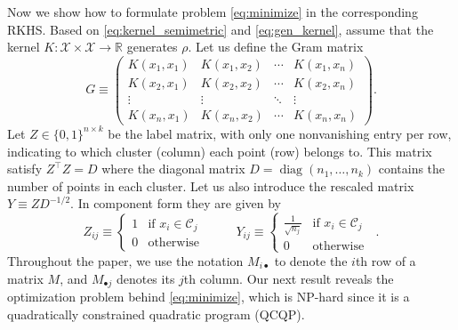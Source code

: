 \documentclass[aps,preprint,nofootinbib,floatfix]{revtex4-1}
\DeclareMathOperator{\diag}{diag}
\newcommand\kk{K}
\newcommand\C{{\mathcal{C}}}
\newcommand\Zt{Y}
\begin{document}
Now we show how to formulate problem \eqref{eq:minimize} in the corresponding
RKHS.
Based on 
\eqref{eq:kernel_semimetric} and \eqref{eq:gen_kernel}, assume that 
the kernel $\kk: \mathcal{X} \times \mathcal{X} \to \mathbb{R}$ 
generates $\rho$. 
Let us define  the Gram matrix
\begin{equation}
\label{eq:kernel_matrix}
G \equiv \begin{pmatrix}
\kk(x_1,x_1) & \kk(x_1,x_2) & \dotsm & \kk(x_1,x_n) \\
\kk(x_2,x_1) & \kk(x_2,x_2) & \dotsm & \kk(x_2,x_n) \\
\vdots & \vdots & \ddots  & \vdots \\
\kk(x_n,x_1) & \kk(x_n,x_2) & \dotsm & \kk(x_n,x_n) 
\end{pmatrix} .
\end{equation}
Let $Z \in \{ 0,1 \}^{n\times k}$ be the label matrix, 
with only one nonvanishing entry per row, 
indicating to which cluster (column)
each point (row) belongs to. This matrix satisfy
$Z^\top Z = D$ where the diagonal matrix 
$D = \diag( n_1,\dotsc, n_k )$  contains
the number of points in each cluster. Let us also introduce the rescaled
matrix  $Y \equiv Z D^{-1/2}$. In component form they are given by
\begin{equation}
\label{eq:label_matrix}
Z_{ij} \equiv \begin{cases}
1 & \mbox{if $x_i \in \C_j$ } \\
0 & \mbox{otherwise}
\end{cases} \qquad
\Zt_{ij} \equiv \begin{cases}
\tfrac{1}{\sqrt{n_j}} & \mbox{if $x_i \in \C_j$ } \\
0 & \mbox{otherwise}
\end{cases} .
\end{equation}
Throughout the paper, we use the notation $M_{i\bullet}$ to denote
the $i$th row of a matrix $M$, and $M_{\bullet j}$ denotes its $j$th column.
Our next result reveals the optimization problem behind \eqref{eq:minimize},
which is NP-hard since
it is a quadratically constrained quadratic program (QCQP).
\end{document}
